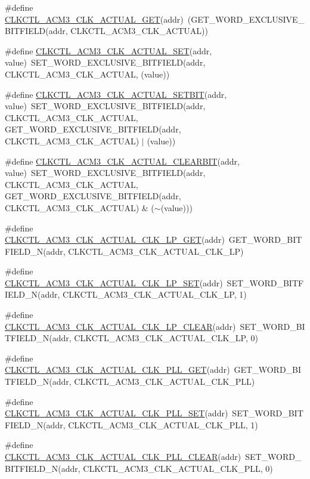 \begin{DoxyCompactItemize}
\#define \hyperlink{a00544_afa1e515ea377d5dc8128eed6ed59678a}{CLKCTL\_\-ACM3\_\-CLK\_\-ACTUAL\_\-GET}(addr)~(GET\_\-WORD\_\-EXCLUSIVE\_\-BITFIELD(addr, CLKCTL\_\-ACM3\_\-CLK\_\-ACTUAL))
\item 
\#define \hyperlink{a00544_ad8c37bab98128b46a2ddfbecef64aa2a}{CLKCTL\_\-ACM3\_\-CLK\_\-ACTUAL\_\-SET}(addr, value)~SET\_\-WORD\_\-EXCLUSIVE\_\-BITFIELD(addr, CLKCTL\_\-ACM3\_\-CLK\_\-ACTUAL, (value))
\item 
\#define \hyperlink{a00544_ad6f9b8f230c53a4d639205378ccdccaa}{CLKCTL\_\-ACM3\_\-CLK\_\-ACTUAL\_\-SETBIT}(addr, value)~SET\_\-WORD\_\-EXCLUSIVE\_\-BITFIELD(addr, CLKCTL\_\-ACM3\_\-CLK\_\-ACTUAL, GET\_\-WORD\_\-EXCLUSIVE\_\-BITFIELD(addr, CLKCTL\_\-ACM3\_\-CLK\_\-ACTUAL) $|$ (value))
\item 
\#define \hyperlink{a00544_aa2fa1debe64dc833f90a08bb6fed5ae8}{CLKCTL\_\-ACM3\_\-CLK\_\-ACTUAL\_\-CLEARBIT}(addr, value)~SET\_\-WORD\_\-EXCLUSIVE\_\-BITFIELD(addr, CLKCTL\_\-ACM3\_\-CLK\_\-ACTUAL, GET\_\-WORD\_\-EXCLUSIVE\_\-BITFIELD(addr, CLKCTL\_\-ACM3\_\-CLK\_\-ACTUAL) \& ($\sim$(value)))
\item 
\#define \hyperlink{a00544_add5ded032657a07e3cfb70fb266596b2}{CLKCTL\_\-ACM3\_\-CLK\_\-ACTUAL\_\-CLK\_\-LP\_\-GET}(addr)~GET\_\-WORD\_\-BITFIELD\_\-N(addr, CLKCTL\_\-ACM3\_\-CLK\_\-ACTUAL\_\-CLK\_\-LP)
\item 
\#define \hyperlink{a00544_aaa4c6d892ec0cd0ce1bc964932d7f812}{CLKCTL\_\-ACM3\_\-CLK\_\-ACTUAL\_\-CLK\_\-LP\_\-SET}(addr)~SET\_\-WORD\_\-BITFIELD\_\-N(addr, CLKCTL\_\-ACM3\_\-CLK\_\-ACTUAL\_\-CLK\_\-LP, 1)
\item 
\#define \hyperlink{a00544_af31be747b2e652b93360ef24e0f0535a}{CLKCTL\_\-ACM3\_\-CLK\_\-ACTUAL\_\-CLK\_\-LP\_\-CLEAR}(addr)~SET\_\-WORD\_\-BITFIELD\_\-N(addr, CLKCTL\_\-ACM3\_\-CLK\_\-ACTUAL\_\-CLK\_\-LP, 0)
\item 
\#define \hyperlink{a00544_a5ab812d22ef21d47921e5f966eccb0b8}{CLKCTL\_\-ACM3\_\-CLK\_\-ACTUAL\_\-CLK\_\-PLL\_\-GET}(addr)~GET\_\-WORD\_\-BITFIELD\_\-N(addr, CLKCTL\_\-ACM3\_\-CLK\_\-ACTUAL\_\-CLK\_\-PLL)
\item 
\#define \hyperlink{a00544_aae9bd05fc09f9b3874a9f1e1c153bcbe}{CLKCTL\_\-ACM3\_\-CLK\_\-ACTUAL\_\-CLK\_\-PLL\_\-SET}(addr)~SET\_\-WORD\_\-BITFIELD\_\-N(addr, CLKCTL\_\-ACM3\_\-CLK\_\-ACTUAL\_\-CLK\_\-PLL, 1)
\item 
\#define \hyperlink{a00544_a49f4f77efdf5b8fcc757742d0ef43bf5}{CLKCTL\_\-ACM3\_\-CLK\_\-ACTUAL\_\-CLK\_\-PLL\_\-CLEAR}(addr)~SET\_\-WORD\_\-BITFIELD\_\-N(addr, CLKCTL\_\-ACM3\_\-CLK\_\-ACTUAL\_\-CLK\_\-PLL, 0)

\end{DoxyCompactItemize}
